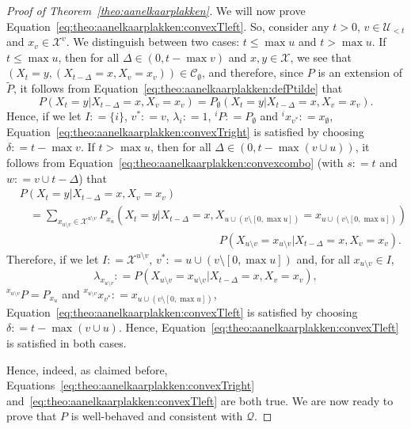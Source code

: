 \documentclass[10pt,a4paper]{paper}
\theoremstyle{definition}
\newcommand{\states}{\mathcal{X}}
\newcommand{\coloneqq}{:\!=}
\begin{document}
\begin{proof}[Proof of Theorem~\ref{theo:aanelkaarplakken}]
We will now prove Equation~\eqref{eq:theo:aanelkaarplakken:convexTleft}. So, consider any $t>0$, $v\in\mathcal{U}_{<t}$ and $x_v\in\states^v$.
We distinguish between two cases: $t\leq\max u$ and $t>\max u$. If $t\leq\max u$, then for all $\Delta\in(0,t-\max v)$ and $x,y\in\states$, we see that $(X_{t}=y,(X_{t-\Delta}=x, X_v=x_v))\in\mathcal{C}_\emptyset$, and therefore, since $P$ is an extension of $\tilde{P}$, it follows from Equation~\eqref{eq:theo:aanelkaarplakken:defPtilde} that
\begin{equation*}
P(X_{t}=y\vert X_{t-\Delta}=x, X_v=x_v)
=P_\emptyset(X_{t}=y\vert X_{t-\Delta}=x, X_v=x_v).
\end{equation*}
Hence, if we let $I\coloneqq\{i\}$, $v^*\coloneqq v$, $\lambda_i\coloneqq 1$, ${}^iP\coloneqq P_\emptyset$ and ${}^ix_{v^*}\coloneqq x_\emptyset$, Equation~\eqref{eq:theo:aanelkaarplakken:convexTright} is satisfied by choosing $\delta\coloneqq t-\max v$.
If $t>\max u$, then for all $\Delta\in(0,t-\max(v\cup u))$, it follows from Equation~\eqref{eq:theo:aanelkaarplakken:convexcombo} (with $s\coloneqq t$ and $w\coloneqq v\cup {t-\Delta}$) that
\begin{align*}
&P(X_{t}=y\vert X_{t-\Delta}=x, X_v=x_v)\\
&~~~~=
\sum_{x_{u\setminus v}\in\states^{u\setminus v}}
P_{x_u}(X_{t}=y\vert X_{t-\Delta}=x, 
X_{u\cup(v\setminus [0,\max u])}= 
x_{u\cup(v\setminus [0,\max u])})\\[-4mm]
&\quad\quad\quad\quad\quad\quad\quad\quad\quad\quad\quad\quad\quad\quad\quad\quad\quad\quad
P(X_{u\setminus v}=x_{u\setminus v}
\vert X_{t-\Delta}=x, X_v=x_v).
\end{align*}
Therefore, if we let $I\coloneqq\states^{u\setminus v}$, $v^*\coloneqq u\cup(v\setminus [0,\max u])$ and, for all $x_{u\setminus v}\in I$,
\begin{equation*}
\lambda_{x_{u\setminus v}}
\coloneqq P(X_{u\setminus v}=x_{u\setminus v}
\vert X_{t-\Delta}=x, X_v=x_v),
\end{equation*}
${}^{x_{u\setminus v}}P=P_{x_u}$ and ${}^{x_{u\setminus v}}x_{v^*}\coloneqq
x_{ u\cup(v\setminus [0,\max u])}$, Equation~\eqref{eq:theo:aanelkaarplakken:convexTleft} is satisfied by choosing $\delta\coloneqq t-\max(v\cup u)$.
Hence, Equation~\eqref{eq:theo:aanelkaarplakken:convexTleft} is satisfied in both cases.


Hence, indeed, as claimed before, Equations~\eqref{eq:theo:aanelkaarplakken:convexTright} and~\eqref{eq:theo:aanelkaarplakken:convexTleft} are both true.
We are now ready to prove that $P$ is well-behaved and consistent with $\mathcal{Q}$.


\end{proof}
\end{document}
